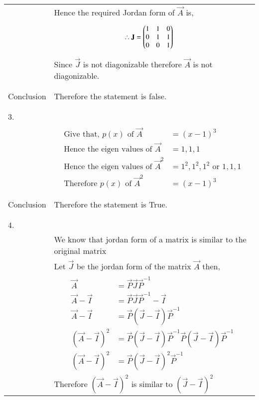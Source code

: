 \documentclass[journal,12pt]{IEEEtran}
\begin{document}
\begin{longtable}{|l|l|}
&Hence the required Jordan form of $\vec{A}$ is,\\
&\parbox{6cm}{\begin{align*}
    \therefore \mathbf{J}&=\begin{pmatrix}1&1&0\\0&1&1\\0&0&1\end{pmatrix}
\end{align*}}\\
&Since $\vec{J}$ is not diagonizable therefore $\vec{A}$ is not diagonizable.\\
&\\
\hline
&\\
Conclusion&Therefore the statement is false.\\
&\\
\hline
&\\
3.&\\
&\parbox{10cm}{\begin{align*}
    \mbox{Give that, }p(x)\mbox{ of }\vec{A}&=(x-1)^3\\
    \mbox{Hence the eigen values of }\vec{A}&=1,1,1\\
    \mbox{Hence the eigen values of }\vec{A}^2&=1^2,1^2,1^2\mbox{ or } 1,1,1\\
    \mbox{Therefore }p(x)\mbox{ of }\vec{A}^2&=(x-1)^3
\end{align*}}\\
&\\
\hline
&\\
Conclusion&Therefore the statement is True.\\
&\\
\hline
\pagebreak
\hline
&\\
4.&\\
&We know that jordan form of a matrix is similar to the original matrix\\
&Let $\vec{J}$ be the jordan form of the matrix $\vec{A}$ then,\\
&\parbox{6cm}{\begin{align*}
    \vec{A}&=\vec{P}\vec{J}\vec{P}^{-1}\\
    \vec{A}-\vec{I}&=\vec{P}\vec{J}\vec{P}^{-1}-\vec{I}\\
    \vec{A}-\vec{I}&=\vec{P}(\vec{J}-\vec{I})\vec{P}^{-1}\\
    (\vec{A}-\vec{I})^2&=\vec{P}(\vec{J}-\vec{I})\vec{P}^{-1}\vec{P}(\vec{J}-\vec{I})\vec{P}^{-1}\\
    (\vec{A}-\vec{I})^2&=\vec{P}(\vec{J}-\vec{I})^2\vec{P}^{-1}
\end{align*}}\\
&Therefore $(\vec{A}-\vec{I})^2$ is similar to $(\vec{J}-\vec{I})^2$\\

\end{longtable}
\end{document}
